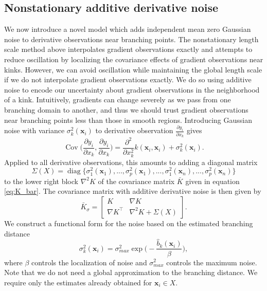 \documentclass{article}
\newcommand{\mat}[1]{\begin{bmatrix}#1\end{bmatrix}}
\renewcommand{\vec}[1]{\mathbf{#1}}
\DeclareMathOperator{\Cov}{Cov}
\DeclareMathOperator{\diag}{diag}
\numberwithin{equation}{section}
\begin{document}
\subsection{Nonstationary additive derivative noise} \label{ADN}
We now introduce a novel model which adds independent mean zero Gaussian noise to derivative observations near branching points. The nonstationary length scale method above interpolates gradient observations exactly and attempts to reduce oscillation by localizing the covariance effects of gradient observations near kinks. However, we can avoid oscillation while maintaining the global length scale if we do not interpolate gradient observations exactly. We do so using additive noise to encode our uncertainty about gradient observations in the neighborhood of a kink. Intuitively, gradients can change severely as we pass from one branching domain to another, and thus we should trust gradient observations near branching points less than those in smooth regions. Introducing Gaussian noise with variance $\sigma^2_k(\vec{x}_i)$ to derivative observation $\frac{\partial y_i}{\partial x_k}$ gives
$$ \Cov\Big(\frac{\partial y_i}{\partial x_k}, \frac{\partial y_i}{\partial x_k}\Big) = \frac{\partial^2}{\partial x_k^2} k(\vec{x}_i, \vec{x}_i) + \sigma^2_k(\vec{x}_i). $$
Applied to all derivative observations, this amounts to adding a diagonal matrix
$$\Sigma(X) = \diag\{\sigma^2_1(\vec{x}_1),...,\sigma^2_p(\vec{x}_1),...,\sigma^2_1(\vec{x}_n),...,\sigma^2_p(\vec{x}_n)\}$$
to the lower right block $\nabla^2 K$ of the covariance matrix $\bar{K}$ given in equation \ref{eq:K_bar}. The covariance matrix with additive derivative noise is then given by
$$ \bar{K}_\sigma = \mat{K & \nabla K \\ \nabla K^\top & \nabla^2 K + \Sigma(X)}. $$
We construct a functional form for the noise based on the estimated branching distance
\begin{equation}
  \sigma^2_k(\vec{x}_i) = \sigma^2_{max} \exp\bigg(- \frac{\hat{b}_k(\vec{x}_i)}{\beta}\bigg), \label{eq:noise}
\end{equation}
where $\beta$ controls the localization of noise and $\sigma_{max}^2$ controls the maximum noise. Note that we do not need a global approximation to the branching distance. We require only the estimates already obtained for $\vec{x}_i \in X$.
\end{document}
